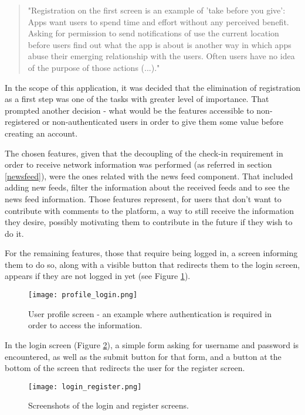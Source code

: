 \begin{quote}
"Registration on the first screen is an example of 'take before you give': Apps want users to spend time and effort without any perceived benefit. Asking for permission to send notifications of use the current location before users find out what the app is about is another way in which apps abuse their emerging relationship with the users. Often users have no idea of the purpose of those actions (...)." \cite{kn:NB12}
\end{quote}


In the scope of this application, it was decided that the elimination of registration as a first step was one of the tasks with greater level of importance. That prompted another decision - what would be the features accessible to non-registered or non-authenticated users in order to give them some value before creating an account. 

The chosen features, given that the decoupling of the check-in requirement in order to receive network information was performed (as referred in section \ref{newsfeed}), were the ones related with the news feed component. That included adding new feeds, filter the information about the received feeds and to see the news feed information. 
Those features represent, for users that don't want to contribute with comments to the platform, a way to still receive the information they desire, possibly motivating them to contribute in the future if they wish to do it.

For the remaining features, those that require being logged in, a screen informing them to do so, along with a visible button that redirects them to the login screen, appears if they are not logged in yet (see Figure \ref{fig:auth1}). 

\begin{figure}[h!]
  \begin{center}
    \leavevmode
    \texttt{[image: profile\_login.png]}
    \caption{User profile screen - an example where authentication is required in order to access the information.}
    \label{fig:auth1}
  \end{center}
\end{figure}

In the login screen (Figure \ref{fig:auth2}), a simple form asking for username and password is encountered, as well as the submit button for that form, and a button at the bottom of the screen that redirects the user for the register screen.

\begin{figure}[h!]
  \begin{center}
    \leavevmode
    \texttt{[image: login\_register.png]}
    \caption{Screenshots of the login and register screens.}
    \label{fig:auth2}
  \end{center}
\end{figure}

